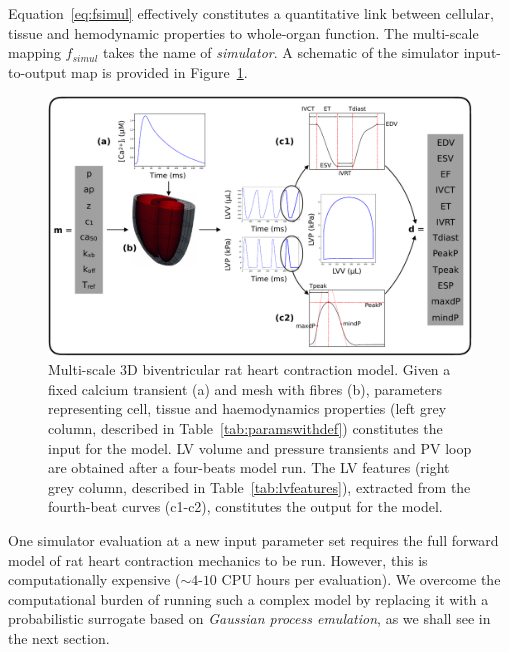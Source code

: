 \noindent
Equation~\eqref{eq:fsimul} effectively constitutes a quantitative link between cellular, tissue and hemodynamic properties to whole-organ function. The multi-scale mapping $f_{simul}$ takes the name of \textit{simulator}. A schematic of the simulator input-to-output map is provided in Figure~\ref{fig:simulatorframework}.

\begin{figure}[!ht]
    \myfloatalign
    \includegraphics[width=\textwidth]{figures/chapter03/simulator_framework.pdf}
    \caption{Multi-scale $3$D biventricular rat heart contraction model. Given a fixed calcium transient (a) and mesh with fibres (b), parameters representing cell, tissue and haemodynamics properties (left grey column, described in Table~\ref{tab:paramswithdef}) constitutes the input for the model. LV volume and pressure transients and PV loop are obtained after a four-beats model run. The LV features (right grey column, described in Table~\ref{tab:lvfeatures}), extracted from the fourth-beat curves (c1-c2), constitutes the output for the model. }
    \label{fig:simulatorframework}
\end{figure}

\vspace{0.2cm}
One simulator evaluation at a new input parameter set requires the full forward model of rat heart contraction mechanics to be run. However, this is computationally expensive ($\sim 4$-$10$ CPU hours per evaluation). We overcome the computational burden of running such a complex model by replacing it with a probabilistic surrogate based on \textit{Gaussian process emulation}, as we shall see in the next section.


%
%
%
